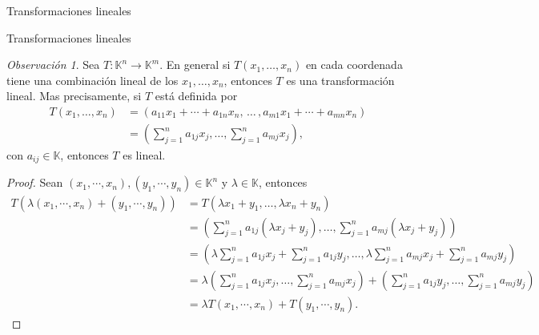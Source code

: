 \documentclass[a4paper,12pt,twoside,spanish,reqno]{amsbook}
\numberwithin{equation}{section}
\theoremstyle{definition}
\theoremstyle{remark}
\newtheorem{obs}[teorema]{Observaci\'on}
\newcommand{\K}{\mathbb K}
\begin{document}
\begin{chapter}{Transformaciones lineales}
\begin{section}{Transformaciones lineales}
            \begin{obs}\label{obs-tl-1.5} 	Sea $T: \K^n \to \K^m$. En  general si $T(x_1,\ldots,x_n)$ en cada coordenada tiene una combinación lineal de los $x_1,\ldots,x_n$,  entonces $T$ es una transformación lineal. Mas precisamente, si $T$ está definida por
                \begin{align*}
                T(x_1,\ldots,x_n) &= (a_{11}x_1+\cdots + a_{1n}x_n,\, \ldots\,,a_{m1}x_1+\cdots + a_{mn}x_n )\\
                &=(\sum_{j=1}^n a_{1j} x_j,\ldots,\sum_{j=1}^n a_{mj} x_j),
                \end{align*}
                con $a_{ij} \in \K$, entonces $T$  es lineal. 
            \begin{proof}
                Sean $(x_1,\cdots,x_n), (y_1,\cdots,y_n) \in \K^n$ y $\lambda \in \K$,  entonces
                \begin{align*}
                T(\lambda(x_1,\cdots,x_n)+ (y_1,\cdots,y_n)) &= T(\lambda x_1+y_1,\ldots,\lambda x_n+y_n) \\
                &= (\sum_{j=1}^n a_{1j} (\lambda x_j+y_j),\ldots,\sum_{j=1}^n a_{mj} (\lambda x_j+y_j)) \\
                &= (\lambda\sum_{j=1}^n a_{1j} x_j+\sum_{j=1}^n a_{1j} y_j,\ldots,\lambda\sum_{j=1}^n a_{mj} x_j+\sum_{j=1}^n a_{mj} y_j) \\
                &= \lambda(\sum_{j=1}^n a_{1j} x_j,\ldots,\sum_{j=1}^n a_{mj} x_j) +(\sum_{j=1}^n a_{1j} y_j,\ldots,\sum_{j=1}^n a_{mj} y_j) \\
                & =\lambda T(x_1,\cdots,x_n)+ T(y_1,\cdots,y_n).
                \end{align*}
            \end{proof}
            \end{obs}
            

\end{section}
\end{chapter}
\end{document}
